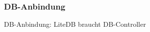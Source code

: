 \subsubsection{DB-Anbindung} \label{subsubsec:DB-Anbindung}
DB-Anbindung: LiteDB braucht DB-Controller